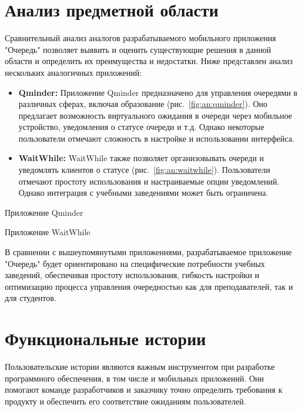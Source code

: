 \section{Анализ предметной области}

Сравнительный анализ аналогов разрабатываемого мобильного приложения "Очередь"
позволяет выявить и оценить существующие решения в данной области
и определить их преимущества и недостатки.
Ниже представлен анализ нескольких аналогичных приложений:

\begin{itemize}
	\item \textbf{Qminder:} Приложение Qminder предназначено
		для управления очередями в различных сферах,
		включая образование (рис.~\ref{fig:an:qminder}).
		Оно предлагает возможность виртуального ожидания
		в очереди через мобильное устройство,
		уведомления о статусе очереди и т.д.
		Однако некоторые пользователи отмечают сложность в настройке
		и использовании интерфейса.
	\item \textbf{WaitWhile:} WaitWhile также позволяет организовывать
		очереди и уведомлять клиентов о статусе (рис.~\ref{fig:an:waitwhile}).
		Пользователи отмечают простоту использования
		и настраиваемые опции уведомлений.
		Однако интеграция с учебными заведениями может быть ограничена.
\end{itemize}

\begin{image}
	\caption{Приложение Qminder}
	\label{fig:an:qminder}
\end{image}

\begin{image}
	\caption{Приложение WaitWhile}
	\label{fig:an:waitwhile}
\end{image}

В сравнении с вышеупомянутыми приложениями,
разрабатываемое приложение "Очередь" будет ориентировано
на специфические потребности учебных заведений,
обеспечивая простоту использования, гибкость настройки
и оптимизацию процесса управления очередностью как для преподавателей,
так и для студентов.

\section{Функциональные истории}

Пользовательские истории являются важным инструментом
при разработке программного обеспечения, в том числе и мобильных приложений.
Они помогают команде разработчиков и заказчику точно определить требования
к продукту и обеспечить его соответствие ожиданиям пользователей.

